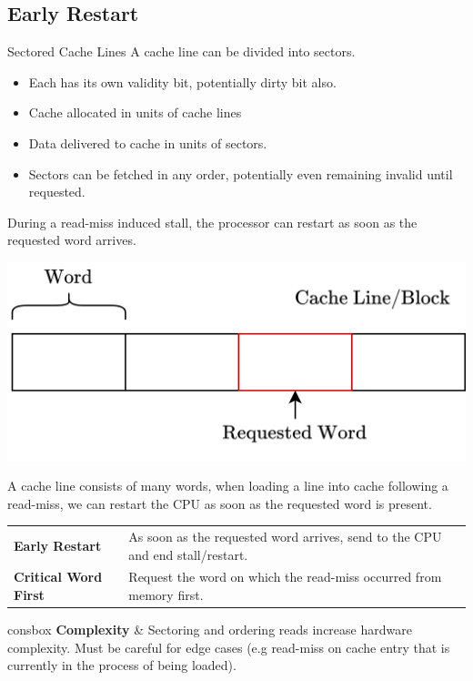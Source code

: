 \subsection{Early Restart}
\begin{definitionbox}{Sectored Cache Lines}
	A cache line can be divided into sectors.
	\begin{itemize}
		\item Each has its own validity bit, potentially dirty bit also.
		\item Cache allocated in units of cache lines
		\item Data delivered to cache in units of sectors.
		\item Sectors can be fetched in any order, potentially even remaining invalid until requested.
	\end{itemize}
\end{definitionbox}
During a read-miss induced stall, the processor can restart as soon as the requested word arrives.
\begin{center}
	\includegraphics[width=.7\textwidth]{caches/images/cache_block_critical_word.drawio.png}
\end{center}
A cache line consists of many words, when loading a line into cache following a read-miss, we can restart the CPU as soon as the requested word is present.
\begin{center}
	\begin{tabular}{p{} p{}}
		\textbf{Early Restart}       & As soon as the requested word arrives, send to the CPU and end stall/restart. \\
		\textbf{Critical Word First} & Request the word on which the read-miss occurred from memory first.           \\
	\end{tabular}
\end{center}
\begin{tabbox}{consbox}
	\textbf{Complexity} & Sectoring and ordering reads increase hardware complexity. Must be careful for edge cases (e.g read-miss on cache entry that is currently in the process of being loaded). \\
\end{tabbox}

